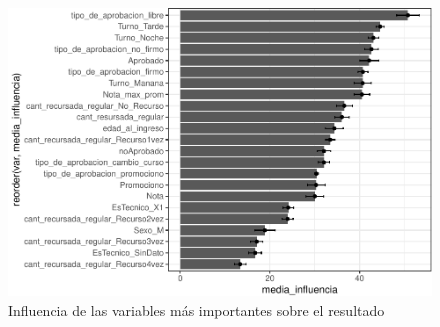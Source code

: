 \begin{figure}[!htb]
	\centering
	\includegraphics{imagenes/variables/influencia_de_variables_23-1.pdf}
	\caption{Influencia de las variables más importantes sobre el resultado}
	\label{fig:rfe_influencia_var_dsalternativa2}
\end{figure}




